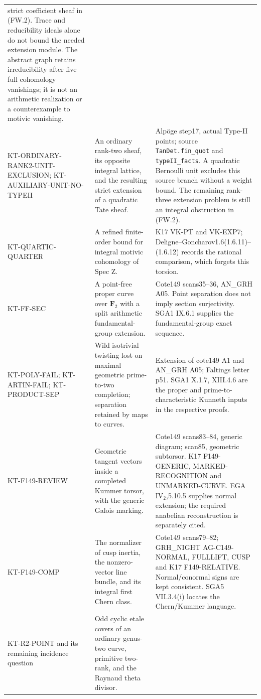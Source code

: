 \begin{longtable}{>{\raggedright\arraybackslash}p{}
>{\raggedright\arraybackslash}p{}
>{\raggedright\arraybackslash}p{}}
strict coefficient sheaf in (FW.2). Trace and reducibility
ideals alone do not bound the needed extension module.
The abstract graph retains irreducibility after five full
cohomology vanishings; it is not an arithmetic realization
or a counterexample to motivic vanishing.\\
KT-ORDINARY-RANK2-UNIT-EXCLUSION;
KT-AUXILIARY-UNIT-NO-TYPEII &
An ordinary rank-two sheaf, its opposite integral lattice,
and the resulting strict extension of a quadratic Tate sheaf. &
Alp\"oge step17, actual Type-II points; source
\texttt{TanDet.fin\_quot} and \texttt{typeII\_facts}.
A quadratic Bernoulli unit excludes this source branch
without a weight bound. The remaining rank-three extension
problem is still an integral obstruction in (FW.2).\\
KT-QUARTIC-QUARTER &
A refined finite-order bound for integral motivic cohomology
of Spec Z. &
K17 VK-PT and VK-EXP7; Deligne--Goncharov1.6(1.6.11)--(1.6.12)
records the rational comparison, which forgets this torsion.\\
KT-FF-SEC &
A point-free proper curve over $\mathbf F_2$ with a split
arithmetic fundamental-group extension. &
Cote149 scans35--36, AN\_GRH A05. Point separation does not
imply section surjectivity. SGA1 IX.6.1 supplies the
fundamental-group exact sequence.\\
KT-POLY-FAIL; KT-ARTIN-FAIL; KT-PRODUCT-SEP &
Wild isotrivial twisting lost on maximal geometric
prime-to-two completion; separation retained by maps to curves. &
Extension of cote149 A1 and AN\_GRH A05; Faltings letter p51.
SGA1 X.1.7, XIII.4.6 are the proper and prime-to-characteristic
Kunneth inputs in the respective proofs.\\
KT-F149-REVIEW &
Geometric tangent vectors inside a completed Kummer torsor,
with the generic Galois marking. &
Cote149 scans83--84, generic diagram; scan85, geometric
subtorsor. K17 F149-GENERIC, MARKED-RECOGNITION and
UNMARKED-CURVE. EGA IV$_2$,5.10.5 supplies normal extension;
the required anabelian reconstruction is separately cited.\\
KT-F149-COMP &
The normalizer of cusp inertia, the nonzero-vector line bundle,
and its integral first Chern class. &
Cote149 scans79--82; GRH\_NIGHT AG-C149-NORMAL, FULLLIFT,
CUSP and K17 F149-RELATIVE. Normal/conormal signs are kept
consistent. SGA5 VII.3.4(i) locates the Chern/Kummer language.\\
KT-R2-POINT and its remaining incidence question &
Odd cyclic etale covers of an ordinary genus-two curve,
primitive two-rank, and the Raynaud theta divisor. &

\end{longtable}

